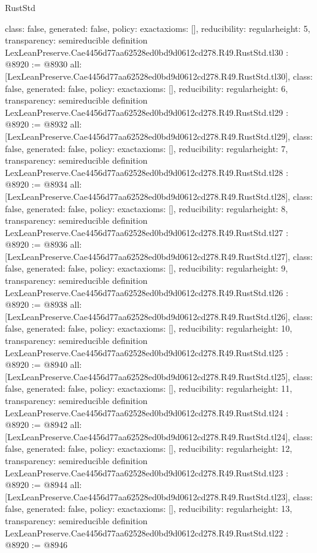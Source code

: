 \begin{lexlean}{RustStd}
\begin{coremodule}
{  class: false,
  generated: false,
  policy: exact{axioms: []},
  reducibility: regular{height: 5},
  transparency: semireducible
}
definition LexLeanPreserve.Cae4456d77aa62528ed0bd9d0612cd278.R49.RustStd.tl30 : @8920 := @8930 {
  all: [LexLeanPreserve.Cae4456d77aa62528ed0bd9d0612cd278.R49.RustStd.tl30],
  class: false,
  generated: false,
  policy: exact{axioms: []},
  reducibility: regular{height: 6},
  transparency: semireducible
}
definition LexLeanPreserve.Cae4456d77aa62528ed0bd9d0612cd278.R49.RustStd.tl29 : @8920 := @8932 {
  all: [LexLeanPreserve.Cae4456d77aa62528ed0bd9d0612cd278.R49.RustStd.tl29],
  class: false,
  generated: false,
  policy: exact{axioms: []},
  reducibility: regular{height: 7},
  transparency: semireducible
}
definition LexLeanPreserve.Cae4456d77aa62528ed0bd9d0612cd278.R49.RustStd.tl28 : @8920 := @8934 {
  all: [LexLeanPreserve.Cae4456d77aa62528ed0bd9d0612cd278.R49.RustStd.tl28],
  class: false,
  generated: false,
  policy: exact{axioms: []},
  reducibility: regular{height: 8},
  transparency: semireducible
}
definition LexLeanPreserve.Cae4456d77aa62528ed0bd9d0612cd278.R49.RustStd.tl27 : @8920 := @8936 {
  all: [LexLeanPreserve.Cae4456d77aa62528ed0bd9d0612cd278.R49.RustStd.tl27],
  class: false,
  generated: false,
  policy: exact{axioms: []},
  reducibility: regular{height: 9},
  transparency: semireducible
}
definition LexLeanPreserve.Cae4456d77aa62528ed0bd9d0612cd278.R49.RustStd.tl26 : @8920 := @8938 {
  all: [LexLeanPreserve.Cae4456d77aa62528ed0bd9d0612cd278.R49.RustStd.tl26],
  class: false,
  generated: false,
  policy: exact{axioms: []},
  reducibility: regular{height: 10},
  transparency: semireducible
}
definition LexLeanPreserve.Cae4456d77aa62528ed0bd9d0612cd278.R49.RustStd.tl25 : @8920 := @8940 {
  all: [LexLeanPreserve.Cae4456d77aa62528ed0bd9d0612cd278.R49.RustStd.tl25],
  class: false,
  generated: false,
  policy: exact{axioms: []},
  reducibility: regular{height: 11},
  transparency: semireducible
}
definition LexLeanPreserve.Cae4456d77aa62528ed0bd9d0612cd278.R49.RustStd.tl24 : @8920 := @8942 {
  all: [LexLeanPreserve.Cae4456d77aa62528ed0bd9d0612cd278.R49.RustStd.tl24],
  class: false,
  generated: false,
  policy: exact{axioms: []},
  reducibility: regular{height: 12},
  transparency: semireducible
}
definition LexLeanPreserve.Cae4456d77aa62528ed0bd9d0612cd278.R49.RustStd.tl23 : @8920 := @8944 {
  all: [LexLeanPreserve.Cae4456d77aa62528ed0bd9d0612cd278.R49.RustStd.tl23],
  class: false,
  generated: false,
  policy: exact{axioms: []},
  reducibility: regular{height: 13},
  transparency: semireducible
}
definition LexLeanPreserve.Cae4456d77aa62528ed0bd9d0612cd278.R49.RustStd.tl22 : @8920 := @8946 {
}
\end{coremodule}
\end{lexlean}
